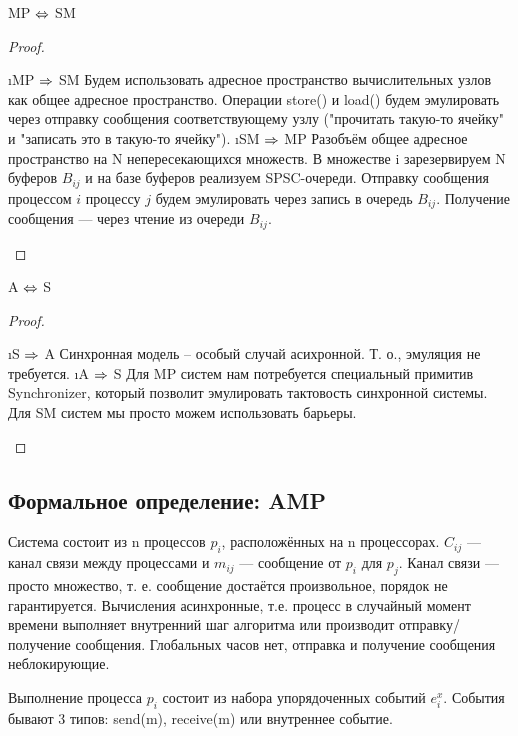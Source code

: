 \begin{stmt}
MP $\Leftrightarrow$ SM
\end{stmt}
\begin{proof}
\begin{itemize}
\i MP $\Rightarrow$ SM
Будем использовать адресное пространство вычислительных узлов как общее адресное пространство.
Операции store() и load() будем эмулировать через отправку сообщения соответствующему узлу ("прочитать такую-то ячейку" и "записать это в такую-то ячейку").
\i SM $\Rightarrow$ MP
Разобъём общее адресное пространство на N непересекающихся множеств. В множестве i зарезервируем N буферов $B_{ij}$ и на базе буферов реализуем SPSC-очереди. Отправку сообщения процессом $i$ процессу $j$ будем эмулировать через запись в очередь $B_{ij}$. Получение сообщения --- через чтение из очереди $B_{ij}$.
\end{itemize}
\end{proof}

\begin{stmt}
A $\Leftrightarrow$ S
\end{stmt}
\begin{proof}
\begin{itemize}
\i S $\Rightarrow$ A
Синхронная модель – особый случай асихронной. Т. о., эмуляция не требуется.
\i A $\Rightarrow$ S
Для MP систем нам потребуется специальный примитив Synchronizer, который позволит эмулировать тактовость синхронной системы.
Для SM систем мы просто можем использовать барьеры.
\end{itemize}
\end{proof}

\subsection{Формальное определение: AMP}

Система состоит из n процессов $p_i$, расположённых на n
процессорах. $C_{ij}$ --- канал связи между процессами и $m_{ij}$ --- сообщение от $p_i$ для $p_j$. Канал связи --- просто множество, т. е. сообщение достаётся произвольное, порядок не гарантируется.
Вычисления асинхронные, т.е. процесс в случайный момент времени выполняет внутренний шаг алгоритма или производит отправку/получение сообщения. Глобальных часов нет, отправка и получение сообщения неблокирующие.

Выполнение процесса $p_i$ состоит из набора упорядоченных событий $e_i^x$.
События бывают 3 типов: send(m), receive(m) или внутреннее событие.

